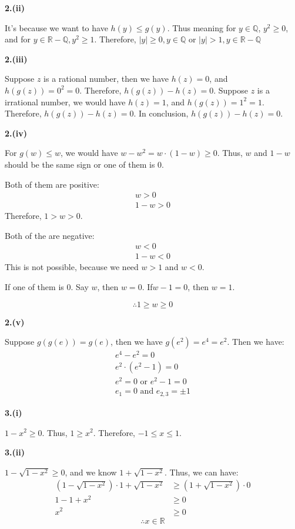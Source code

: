 \documentclass[a4paper,12pt]{report}
\begin{document}
\noindent
\textbf{2.(ii)}

\noindent
It's because we want to have $h(y)\leq g(y)$. Thus meaning for $y\in \mathbb{Q}$, $y^2\geq 0$, and for $y \in \mathbb{R-Q}, y^2\geq 1$. Therefore, $|y|\geq 0,y\in \mathbb{Q}$ or $|y|>1,y \in \mathbb{R-Q}$

\noindent
\textbf{2.(iii)}

\noindent
Suppose $z$ is a rational number, then we have $h(z)=0$, and $h(g(z))=0^2=0$. Therefore, $h(g(z))-h(z)=0$.
Suppose $z$ is a irrational number, we would have $h(z)=1$, and $h(g(z)) = 1^2=1$. Therefore,  $h(g(z))-h(z)=0$.
In conclusion, $h(g(z))-h(z)=0$. 

\noindent
\textbf{2.(iv)}

\noindent
For $g(w)\leq w$, we would have $w-w^2=w\cdot{(1-w)}\geq 0$. Thus, $w$ and $1-w$ should be the same sign or one of them is $0$. 

\noindent
Both of them are positive:
\begin{align*}
w> 0\\
1-w> 0
\end{align*}
Therefore, $1>w>0$.

\noindent
Both of the are negative:
\begin{align*}
w< 0\\
1-w< 0
\end{align*}
This is not possible, because we need $w>1$ and $w<0$.

\noindent
If one of them is $0$. Say $w$, then $w=0$. If$w-1=0$, then $w=1$.

\[\therefore 1\geq w\geq 0\]

\noindent
\textbf{2.(v)}

\noindent
Suppose $g(g(e))=g(e)$, then we have $g(e^2)=e^4=e^2$. Then we have:
\begin{align*}
e^4-e^2=0\\
e^2\cdot{(e^2-1)}=0\\
e^2=0 \text{ or } e^2-1 = 0\\
e_1=0 \text{ and } e_{2,3}=\pm 1
\end{align*}

\noindent
\textbf{3.(i)}

\noindent
$1-x^2\geq 0$. Thus, $1\geq x^2$. Therefore, $-1\leq x\leq 1$.

\noindent
\textbf{3.(ii)}

\noindent
$1-\sqrt{1-x^2}\geq 0$, and we know $1+\sqrt{1-x^2}$. Thus, we can have:
\begin{align*}
(1-\sqrt{1-x^2})\cdot{1+\sqrt{1-x^2}}&\geq(1+\sqrt{1-x^2})\cdot{0}\\
1-1+x^2&\geq 0\\
x^2&\geq 0
\end{align*} 
\[\therefore x\in \mathbb{R}\]
\end{document}
